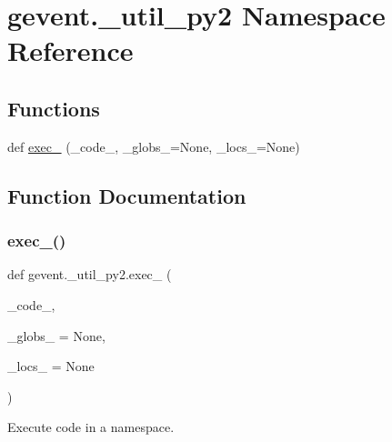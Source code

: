 \hypertarget{namespacegevent_1_1__util__py2}{}\section{gevent.\+\_\+util\+\_\+py2 Namespace Reference}
\label{namespacegevent_1_1__util__py2}
\subsection*{Functions}
\begin{DoxyCompactItemize}
\item 
def \hyperlink{namespacegevent_1_1__util__py2_a5b29af14f99628d722b9405a559f1f40}{exec\+\_\+} (\+\_\+code\+\_\+, \+\_\+globs\+\_\+=None, \+\_\+locs\+\_\+=None)
\end{DoxyCompactItemize}


\subsection{Function Documentation}
\mbox{\label{namespacegevent_1_1__util__py2_a5b29af14f99628d722b9405a559f1f40}} 
\subsubsection{\texorpdfstring{exec\+\_\+()}{exec\_()}}
{\footnotesize\ttfamily def gevent.\+\_\+util\+\_\+py2.\+exec\+\_\+ (\begin{DoxyParamCaption}\item[{}]{\+\_\+code\+\_\+,  }\item[{}]{\+\_\+globs\+\_\+ = {\ttfamily None},  }\item[{}]{\+\_\+locs\+\_\+ = {\ttfamily None} }\end{DoxyParamCaption})}

\begin{DoxyVerb}Execute code in a namespace.\end{DoxyVerb}
 